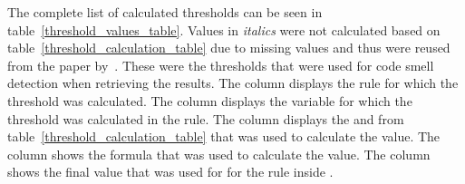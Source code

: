 The complete list of calculated thresholds can be seen in table~\ref{threshold_values_table}.
Values in \textit{italics} were not calculated based on table~\ref{threshold_calculation_table} due to missing values
and thus were reused from the paper by~\cite{ios_code_smell_paper}.
These were the thresholds that were used for code smell detection when retrieving the results.
The column  displays the rule for which the threshold was calculated.
The column  displays the variable for which the threshold was calculated in the rule.
The column  displays the  and  from table~\ref{threshold_calculation_table}
that was used to calculate the value.
The column  shows the formula that was used to calculate the value.
The column  shows the final value that was used for  for the rule inside .

